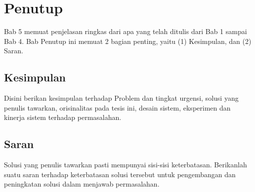 \chapter{Penutup}
\label{bab:penutup}

Bab 5 memuat penjelasan ringkas dari apa yang telah ditulis dari Bab 1 sampai
Bab 4. Bab Penutup ini memuat 2 bagian penting, yaitu (1) Kesimpulan, dan (2)
Saran.

\section{Kesimpulan}

Disini berikan kesimpulan terhadap Problem dan tingkat urgensi, solusi yang
penulis tawarkan, orisinalitas pada tesis ini, desain sistem, eksperimen dan
kinerja sistem terhadap permasalahan.

\section{Saran}

Solusi yang penulis tawarkan pasti mempunyai sisi-sisi keterbatasan. Berikanlah
suatu saran terhadap keterbatasan solusi tersebut untuk pengembangan dan
peningkatan solusi dalam menjawab permasalahan.
